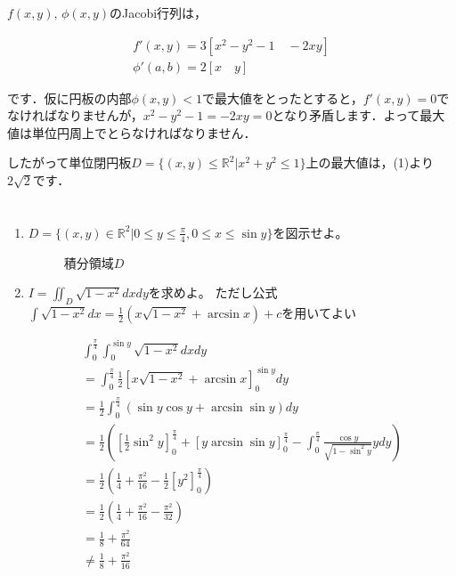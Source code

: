 \documentclass[a4paper,10pt]{jarticle}
\begin{document}
\begin{enumerate}
$f(x,y),\,\phi(x,y)$のJacobi行列は，
\begin{fleqn}[30pt] \begin{gather*}
	f'(x,y) = 3\left[x^2-y^2-1 \quad -2xy\right] \\
	\phi'(a,b) = 2\left[x \quad y\right]
\end{gather*} \end{fleqn}
です．仮に円板の内部$\phi(x,y) < 1$で最大値をとったとすると，$f'(x,y) = 0$でなければなりませんが，$x^2-y^2-1=-2xy=0$となり矛盾します．よって最大値は単位円周上でとらなければなりません．

したがって単位閉円板$D=\{(x,y) \leq \mathbb{R}^2|x^2+y^2 \leq 1\}$上の最大値は，(1)より$2\sqrt{2}$です．
\end{enumerate}

\section{}
\begin{enumerate}
\item$D=\{(x,y)\in \mathbb{R}^2|0 \leq y \leq \frac{\pi}{4}, 0 \leq x \leq \sin{y}\}$を図示せよ。

\begin{figure}[H]
	\begin{center}
	\end{center}
 	\caption{積分領域$D$}
\end{figure}

\item $I=\iint_{D} \sqrt{1-x^2} dxdy$を求めよ。
ただし公式$\int\sqrt{1-x^2}dx=\frac{1}{2}(x\sqrt{1-x^2}+\arcsin{x})+c$を用いてよい
\begin{fleqn}[30pt] \begin{gather*}
	\int_0^{\frac{\pi}{4}} \int_{0}^{\sin{y}} \sqrt{1-x^2} dx dy\\
	=\int_0^{\frac{\pi}{4}} \frac{1}{2} \left[ x\sqrt{1-x^2} + \arcsin{x} \right]_{0}^{\sin{y}} dy\\
	=\frac{1}{2} \int_0^{\frac{\pi}{4}} ( \sin{y}\cos{y}+\arcsin{\sin{y}} ) dy\\
	=\frac{1}{2} \left( \left[ \frac{1}{2}\sin^2{y} \right]^{\frac{\pi}{4}}_0 + \left[ y \arcsin{\sin{y}} \right]^{\frac{\pi}{4}}_0 - \int_0^{\frac{\pi}{4}}\frac{\cos{y}}{\sqrt{1-\sin^2{y}}}ydy \right) \\
	=\frac{1}{2} \left( \frac{1}{4} + \frac{\pi^2}{16} - \frac{1}{2}\left[ y^2 \right]^{\frac{\pi}{4}}_0 \right) \\
	=\frac{1}{2} \left( \frac{1}{4} + \frac{\pi^2}{16} -\frac{\pi^2}{32} \right) \\
	=\frac{1}{8} + \frac{\pi^2}{64}\\
	\ne \frac{1}{8}+\frac{\pi^2}{16}
\end{gather*} \end{fleqn}
\end{enumerate}
\end{document}
